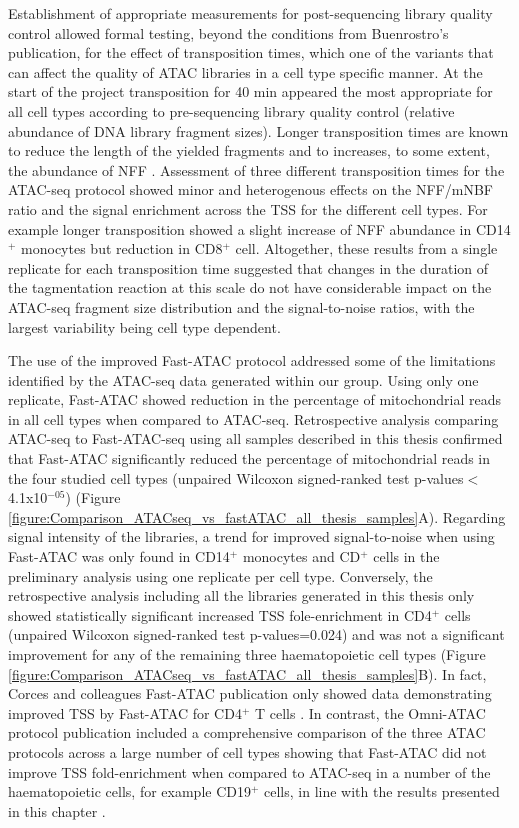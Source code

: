 Establishment of appropriate measurements for post-sequencing library quality control allowed formal testing, beyond the conditions from Buenrostro's publication, for the effect of transposition times, which one of the variants that can affect the quality of ATAC libraries in a cell type specific manner. At the start of the project transposition for 40 min appeared the most appropriate for all cell types according to pre-sequencing library quality control (relative abundance of DNA library fragment sizes). Longer transposition times are known to reduce the length of the yielded fragments and to increases, to some extent, the abundance of NFF \parencite{Raurell-Vila2018}. Assessment of three different transposition times for the ATAC-seq protocol showed minor and heterogenous effects on the NFF/mNBF ratio and the signal enrichment across the TSS for the different cell types. For example longer transposition showed a slight increase of NFF abundance in CD14$^+$ monocytes but reduction in CD8$^+$ cell. Altogether, these results from a single replicate for each transposition time suggested that changes in the duration of the tagmentation reaction at this scale do not have considerable impact on the ATAC-seq fragment size distribution and the signal-to-noise ratios, with the largest variability being cell type dependent.

The use of the improved Fast-ATAC protocol addressed some of the limitations identified by the ATAC-seq data generated within our group. Using only one replicate, Fast-ATAC showed reduction in the percentage of mitochondrial reads in all cell types when compared to ATAC-seq. Retrospective analysis comparing ATAC-seq to Fast-ATAC-seq using all samples described in this thesis confirmed that Fast-ATAC significantly reduced the percentage of mitochondrial reads in the four studied cell types (unpaired Wilcoxon signed-ranked test p-values$<$4.1x10$^{-05}$) (Figure \ref{figure:Comparison_ATACseq_vs_fastATAC_all_thesis_samples}A). Regarding signal intensity of the libraries, a trend for improved signal-to-noise when using Fast-ATAC was only found in CD14$^+$ monocytes and CD$^+$ cells in the preliminary analysis using one replicate per cell type. Conversely, the retrospective analysis including all the libraries generated in this thesis only showed statistically significant increased TSS fole-enrichment in CD4$^+$ cells (unpaired Wilcoxon signed-ranked test p-values=0.024) and was not a significant improvement for any of the remaining three haematopoietic cell types (Figure  \ref{figure:Comparison_ATACseq_vs_fastATAC_all_thesis_samples}B). In fact, Corces and colleagues Fast-ATAC publication only showed data demonstrating improved TSS by Fast-ATAC for CD4$^+$ T cells \parencite{Corces2016}. In contrast, the Omni-ATAC protocol publication included a comprehensive comparison of the three ATAC protocols across a large number of cell types showing that Fast-ATAC did not improve TSS fold-enrichment when compared to ATAC-seq in a number of the haematopoietic cells, for example CD19$^+$ cells, in line with the results presented in this chapter \parencite{Corces2017}.

